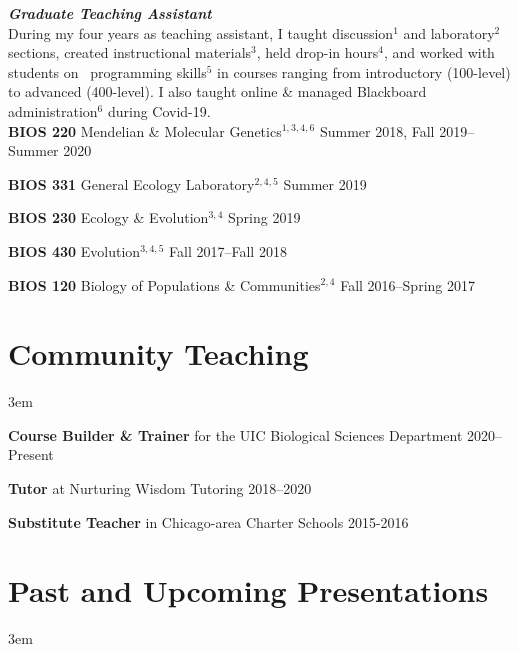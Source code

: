 \documentclass[]{article}
\begin{document}
\textit{\textbf{Graduate Teaching Assistant}}\\
During my four years as teaching assistant, I taught discussion$^{1}$ and laboratory$^{2}$ sections, created instructional materials$^{3}$, held drop-in hours$^{4}$, and worked with students on \textcolor{light-gray}{\faRProject}\ programming skills$^{5}$ in courses ranging from introductory (100-level) to advanced (400-level). I also taught online \& managed Blackboard administration$^{6}$ during Covid-19.\\

\textbf{BIOS 220} Mendelian \& Molecular Genetics$^{1, 3, 4, 6}$ \href{https://ledelaney.org/teaching/genetics220/}{\faLink} \href{https://github.com/ledelaney/Genetics220}{\faGithub}
 \hfill Summer 2018, Fall 2019--Summer 2020


\textbf{BIOS 331} General Ecology Laboratory$^{2, 4, 5}$ \href{https://github.com/ledelaney/GeneralEcologyMaterials}{\faGithub} \hfill Summer 2019

     
\textbf{BIOS 230} Ecology \& Evolution$^{3, 4}$ \hfill Spring 2019
     
\textbf{BIOS 430} Evolution$^{3, 4, 5}$ \hfill Fall 2017--Fall 2018

\textbf{BIOS 120} Biology of Populations \& Communities$^{2, 4}$ \hfill Fall 2016--Spring 2017


\clearpage
\pagestyle{alldocument}

\section{Community Teaching}
\vspace{3mm}
\leftskip 3em

\textbf{Course Builder \& Trainer} for the UIC Biological Sciences Department \href{https://www.ledelaney.org/cb-materials}{\faLink} \href{https://github.com/ledelaney/cb-materials}{\faGithub} \hfill 2020--Present
     
\textbf{Tutor} at Nurturing Wisdom Tutoring \hfill 2018--2020

\textbf{Substitute Teacher} in Chicago-area Charter Schools \hfill 2015-2016

\vspace{2mm}
\section{Past and Upcoming Presentations}

\vspace{3mm}
\leftskip 3em
\end{document}
